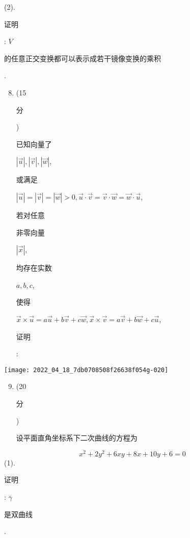 \documentclass[10pt]{article}
\begin{document}
(2). \begin{CJK}{UTF8}{mj}证明\end{CJK}: $V$ \begin{CJK}{UTF8}{mj}的任意正交变换都可以表示成若干镜像变换的乘积\end{CJK}.

\begin{enumerate}
  \setcounter{enumi}{7}
  \item (15 \begin{CJK}{UTF8}{mj}分\end{CJK}) \begin{CJK}{UTF8}{mj}已知向量了\end{CJK} $|\vec{u}|,|\vec{v}|,|\vec{w}|$, \begin{CJK}{UTF8}{mj}或满足\end{CJK} $|\vec{u}|=|\vec{v}|=|\vec{w}|>0, \vec{u} \cdot \vec{v}=\vec{v} \cdot \vec{w}=\vec{w} \cdot \vec{u}$, \begin{CJK}{UTF8}{mj}若对任意\end{CJK} \begin{CJK}{UTF8}{mj}非零向量\end{CJK} $|\vec{x}|$, \begin{CJK}{UTF8}{mj}均存在实数\end{CJK} $a, b, c$, \begin{CJK}{UTF8}{mj}使得\end{CJK} $\vec{x} \times \vec{u}=a \vec{u}+b \vec{v}+c \vec{w}, \vec{x} \times \vec{v}=a \vec{v}+b \vec{w}+c \vec{u}$, \begin{CJK}{UTF8}{mj}证明\end{CJK}:
\end{enumerate}
\texttt{[image: 2022\_04\_18\_7db0708508f26638f054g-020]}

\begin{enumerate}
  \setcounter{enumi}{8}
  \item (20 \begin{CJK}{UTF8}{mj}分\end{CJK}) \begin{CJK}{UTF8}{mj}设平面直角坐标系下二次曲线的方程为\end{CJK}
\end{enumerate}
$$
x^{2}+2 y^{2}+6 x y+8 x+10 y+6=0
$$
(1). \begin{CJK}{UTF8}{mj}证明\end{CJK}: $\gamma$ \begin{CJK}{UTF8}{mj}是双曲线\end{CJK}.
\end{document}
